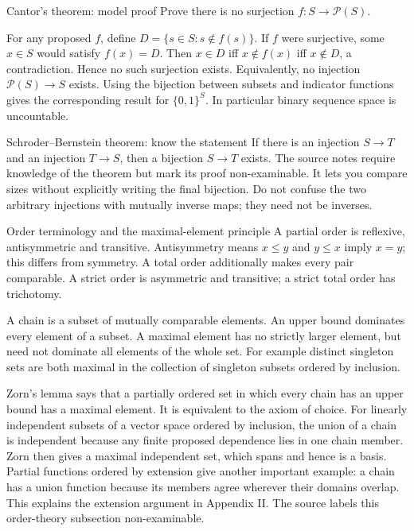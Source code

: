 \begin{exam}{Cantor's theorem: model proof}
Prove there is no surjection $f:S\to\mathcal P(S)$.
\end{exam}
\begin{answer}
For any proposed $f$, define $D=\{s\in S:s\notin f(s)\}$. If $f$ were surjective, some $x\in S$ would satisfy $f(x)=D$. Then $x\in D$ iff $x\notin f(x)$ iff $x\notin D$, a contradiction. Hence no such surjection exists. Equivalently, no injection $\mathcal P(S)\to S$ exists. Using the bijection between subsets and indicator functions gives the corresponding result for $\{0,1\}^S$. In particular binary sequence space is uncountable.
\end{answer}
\begin{note}{Schroder--Bernstein theorem: know the statement}
If there is an injection $S\to T$ and an injection $T\to S$, then a bijection $S\to T$ exists. The source notes require knowledge of the theorem but mark its proof non-examinable. It lets you compare sizes without explicitly writing the final bijection. Do not confuse the two arbitrary injections with mutually inverse maps; they need not be inverses.
\end{note}
\begin{note}{Order terminology and the maximal-element principle}
A partial order is reflexive, antisymmetric and transitive. Antisymmetry means $x\le y$ and $y\le x$ imply $x=y$; this differs from symmetry. A total order additionally makes every pair comparable. A strict order is asymmetric and transitive; a strict total order has trichotomy.

A chain is a subset of mutually comparable elements. An upper bound dominates every element of a subset. A maximal element has no strictly larger element, but need not dominate all elements of the whole set. For example distinct singleton sets are both maximal in the collection of singleton subsets ordered by inclusion.

Zorn's lemma says that a partially ordered set in which every chain has an upper bound has a maximal element. It is equivalent to the axiom of choice. For linearly independent subsets of a vector space ordered by inclusion, the union of a chain is independent because any finite proposed dependence lies in one chain member. Zorn then gives a maximal independent set, which spans and hence is a basis. Partial functions ordered by extension give another important example: a chain has a union function because its members agree wherever their domains overlap. This explains the extension argument in Appendix II. The source labels this order-theory subsection non-examinable.
\end{note}
